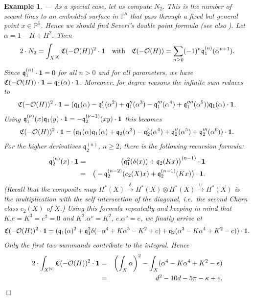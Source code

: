 \documentclass[twoside,11pt]{article}
\newtheorem{example}[theorem]{Example}
\newcommand{\qed}{\hspace*{\fill}$\Box$\vspace{2ex}}
\newcommand{\ko}{{\cal O}}
\newcommand{\IP}{{\mathbb P}}
\newcommand{\gothq}{{\mathfrak q}}
\newcommand{\gothC}{{\mathfrak C}}
\newcommand{\tensor}{\otimes}
\newcommand{\qq}{\gothq}
\newcommand{\vacuum}{{\bf 1}}
\newcommand{\lra}{\longrightarrow}
\begin{document}
\begin{example}---
As a special case, let us compute $N_2$. This is the number of secant lines to 
an embedded surface in $\IP^5$ that pass through a fixed but general point 
$x\in\IP^5$. Hence we should find Severi's double point formula \cite{Severi} (see also \cite{Catanese}). Let $\alpha=1-H+H^2$. Then 
$$2\cdot N_2=\int_{X^{[2]}}\gothC(-\ko(H))^2\cdot\vacuum\quad\mbox{with}\quad
\gothC(-\ko(H))=\sum_{n\geq0}(-1)^n\qq^{(n)}_1(\alpha^{\nu+1}).$$
Since $\qq_1^{(n)}\cdot\vacuum=0$ for all $n>0$ and for all parameters, 
we have $\gothC(-\ko(H))\cdot\vacuum=\qq_1(\alpha)\cdot\vacuum$. Moreover, for degree reasons the infinite sum reduces to
$$\gothC(-\ko(H))^2\cdot\vacuum=(\qq_1(\alpha)-\qq_1'(\alpha^2)+\qq_1''(\alpha^3)-\qq_1'''(\alpha^4)+\qq_1''''(\alpha^5))\qq_1(\alpha)\cdot\vacuum.$$
Using $\qq_1^{(\nu)}(x)\qq_1(y)\cdot\vacuum=-\qq_2^{(\nu-1)}(xy)\cdot\vacuum$ 
this becomes
$$\gothC(-\ko(H))^2\cdot\vacuum=(\qq_1(\alpha)\qq_1(\alpha)+\qq_2(\alpha^3)-\qq_2'(\alpha^4)+\qq_2''(\alpha^5)+\qq_2'''(\alpha^6))\cdot\vacuum.$$
For the higher derivatives $\qq_2^{(n)}$, $n\geq2$, there is the 
following recursion formula: 
\begin{eqnarray*}
\qq_2^{(n)}(x)\cdot\vacuum&=&\big(\qq_1^2(\delta(x))+\qq_2(Kx)\big)^{(n-1)}\cdot\vacuum\\
&=&\big(-\qq_2^{(n-2)}(c_2(X)x)+\qq_2^{(n-1)}(Kx)
\big)\cdot\vacuum.
\end{eqnarray*}
(Recall that the composite map 
$H^*(X)\stackrel{\delta}{\lra}H^*(X)\tensor H^*(X)\stackrel{\cup}{\lra} H^*(X)$ 
is the multiplication with the self intersection of the diagonal, i.e.\ the 
second Chern class $c_2(X)$ of $X$.) Using this formula repeatedly and
keeping in mind that $K.e=K^3=e^2=0$ and $K^2.\alpha^\nu=K^2$, $e.\alpha^\nu=e$,
we finally arrive at
$$\gothC(-\ko(H))^2\cdot\vacuum=(\qq_1(\alpha)^2+\qq_1^2\delta(-\alpha^4+K\alpha^5-K^2+e)
+\qq_2(\alpha^3-K\alpha^4+K^2-e))\cdot\vacuum.$$
Only the first two summands contribute to the integral. Hence
\begin{eqnarray*}
2\cdot\int_{X^{[2]}}\gothC(-\ko(H))^2\cdot\vacuum&=&\left(\int_X\alpha\right)^2-\int_X(\alpha^4-K\alpha^4+K^2-e)\\
&=&d^2-10d-5\pi-\kappa+e.
\end{eqnarray*}
\qed
\end{example}
\end{document}
